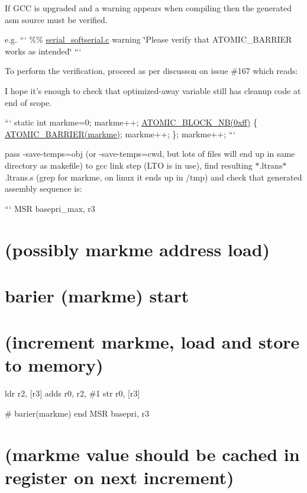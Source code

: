 If G\+C\+C is upgraded and a warning appears when compiling then the generated asm source must be verified.

e.\+g. ``` \%\% \hyperlink{serial__softserial_8c}{serial\+\_\+softserial.\+c} warning \char`\"{}\+Please verify that A\+T\+O\+M\+I\+C\+\_\+\+B\+A\+R\+R\+I\+E\+R works as intended\char`\"{} ```

To perform the verification, proceed as per discusson on issue \#167 which reads\+:

I hope it's enough to check that optimized-\/away variable still has cleanup code at end of scope.

``` static int markme=0; markme++; \hyperlink{atomic_8h_a3d3b26c1ba6839b0b91c774f8dfadd51}{A\+T\+O\+M\+I\+C\+\_\+\+B\+L\+O\+C\+K\+\_\+\+N\+B(0xff)} \{ \hyperlink{atomic_8h_ae5ed9d0b60737832165651f656b2f217}{A\+T\+O\+M\+I\+C\+\_\+\+B\+A\+R\+R\+I\+E\+R(markme)}; markme++; \}; markme++; ```

pass {\ttfamily -\/save-\/temps=obj} (or {\ttfamily -\/save-\/temps=cwd}, but lots of files will end up in same directory as makefile) to gcc link step (L\+T\+O is in use), find resulting {\ttfamily $\ast$.ltrans$\ast$.ltrans.\+s} (grep for {\ttfamily markme}, on linux it ends up in {\ttfamily /tmp}) and check that generated assembly sequence is\+:

``` M\+S\+R basepri\+\_\+max, r3 \section*{(possibly markme address load)}

\section*{barier (markme) start}

\section*{(increment markme, load and store to memory)}

ldr r2, \mbox{[}r3\mbox{]} adds r0, r2, \#1 str r0, \mbox{[}r3\mbox{]} \begin{DoxyVerb}    # barier(markme)  end
    MSR basepri, r3
\end{DoxyVerb}


\section*{(markme value should be cached in register on next increment)}


